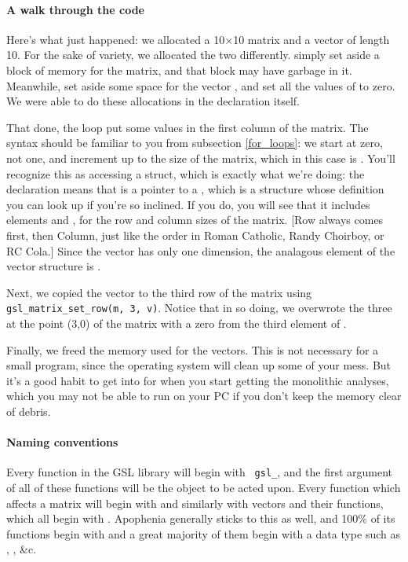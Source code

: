 \paragraph{A walk through the code}
Here's what just happened: we allocated a 10$\times$10 matrix and a vector of
length 10.  For the sake of variety, we  allocated the two differently.
 simply set aside a block of memory for the matrix,
and that block may have garbage in it. Meanwhile,  set
aside some space for the vector , and set all the values of  to
zero.  We were able to do these allocations in the declaration itself.

That done, the  loop put some values in the first column of the matrix. 
The syntax should be familiar to you from subsection \ref{for_loops}: we start at
zero, not one, and increment up to the size of the matrix, which in this case is
. You'll recognize this as accessing a struct, which is exactly
what we're doing: the declaration  means that  is a
pointer to a , which is a structure whose definition you can
look up if you're so inclined. If you do, you will see that it includes 
elements  and , for the row and column sizes of the
matrix. [Row always comes first, then Column, just like the order in Roman Catholic, 
Randy Choirboy, or RC Cola.] Since the vector has only one dimension, the analagous element
of the vector structure is .

Next, we copied the vector to the third row of the matrix using {\tt
gsl\_matrix\_set\_row(m, 3, v)}. Notice that in so doing, we
overwrote the three at the point (3,0) of the matrix with a zero from
the third element of .

Finally, we freed the memory used for the vectors. This is not 
necessary for a small program, since the operating system
will clean up some of your mess. But it's a good habit to get into for
when you start getting the monolithic analyses, which you may not be
able to run on your PC if you don't keep the memory clear of debris.

\paragraph{Naming conventions}  
Every function in the GSL library will begin with {\tt
gsl\_}, and
the first argument of all of these functions will be the object to be acted upon.
Every function which affects a matrix will begin with 
and similarly with vectors and their functions, which all begin with . 
Apophenia generally sticks to this as well, and 100\% of its functions
begin with  and a great majority of them begin with a data
type such as , , \&c.

